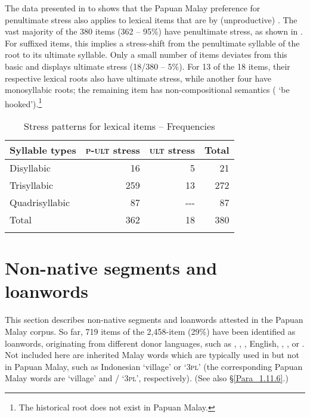 The data presented in  to  shows that the Papuan Malay preference for penultimate stress also applies to lexical items that are  by (unproductive) . The vast majority of the 380 items (362 – 95\%) have penultimate stress, as shown in . For suffixed items, this  implies a stress-shift from the penultimate syllable of the root to its ultimate syllable. Only a small number of items deviates from this basic  and displays ultimate stress (18/380 – 5\%). For 13 of the 18 items, their respective lexical roots also have ultimate stress, while another four have monosyllabic roots; the remaining item has non-compositional semantics ( ‘be hooked’).\footnote{The historical root  does not exist in Papuan Malay.}

\begin{table}
\caption{Stress patterns for  lexical items – Frequencies\label{Table_2.45}}

\begin{tabular}{lrrr}
\lsptoprule
Syllable types & \textsc{p-ult} stress & \textsc{ult} stress &  Total\\


\midrule
Disyllabic &  16 &  5 &  21\\

Trisyllabic &  259 &  13 &  272\\

Quadrisyllabic &  87 &  {}-{}-{}- &  87\\
\midrule
Total &  362 &  18 &  380\\

\lspbottomrule
\end{tabular}
\end{table}
\section{Non-native segments and loanwords\label{Para_2.5}}

This section describes non-native segments and loanwords attested in the Papuan Malay corpus. So far, 719 items of the 2,458-item  (29\%) have been identified as loanwords, originating from different donor languages, such as , , , English, , , or . Not included here are inherited Malay words which are typically used in  but not in Papuan Malay, such as Indonesian  ‘village’ or  ‘\textsc{3pl}’ (the corresponding Papuan Malay words are  ‘village’ and / ‘\textsc{3pl}’, respectively). (See also §\ref{Para_1.11.6}.)



